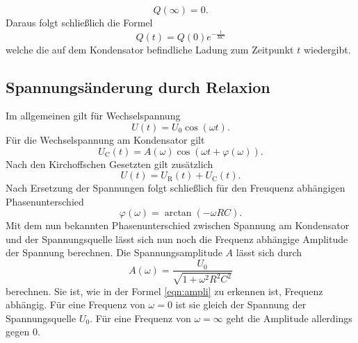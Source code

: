 \begin{equation*}
    Q(\infty) = 0.
\end{equation*}
Daraus folgt schließlich die Formel
\begin{equation}
    Q(t) = Q(0) e^{-\frac{t}{RC}}
    \label{eqn:ladungkondi}
\end{equation}
welche die auf dem Kondensator befindliche Ladung zum Zeitpunkt $t$ wiedergibt.

\subsection{Spannungsänderung durch Relaxion}
Im allgemeinen gilt für Wechselspannung 
\begin{equation}
    U(t) = U_0 \cos(\omega t).
\end{equation}
Für die Wechselspannung am Kondensator gilt 
\begin{equation}
    U_\text{C}(t) = A(\omega) \cos(\omega t + \varphi(\omega)).
\end{equation}
Nach den Kirchoffschen Gesetzten gilt zusätzlich
\begin{equation}
    U(t) = U_\text{R}(t) + U_\text{C}(t).
\end{equation}
Nach Ersetzung der Spannungen folgt schließlich für den Freuquenz abhängigen Phasenunterschied
\begin{equation}
    \varphi(\omega) = \arctan(-\omega RC).
\end{equation}
Mit dem nun bekannten Phasenunterschied zwischen Spannung am Kondensator und der Spannungsquelle lässt sich nun noch die Frequenz abhängige Amplitude der Spannung berechnen.
Die Spannungsamplitude $A$ lässt sich durch 
\begin{equation}
    A(\omega) = \frac{U_0}{\sqrt{1+\omega^2 R^2 C^2}}
    \label{eqn:ampli}
\end{equation}
berechnen.
Sie ist, wie in der Formel \ref{eqn:ampli} zu erkennen ist, Frequenz abhängig.
Für eine Frequenz von $\omega = 0$ ist sie gleich der Spannung der Spannungsquelle $U_0$.
Für eine Frequenz von $\omega = \infty$ geht die Amplitude allerdings gegen 0.

